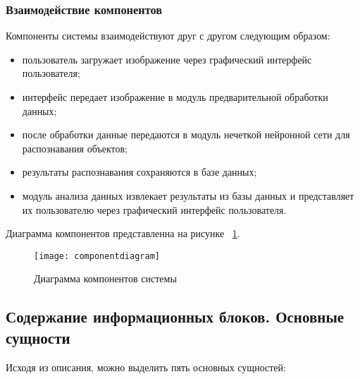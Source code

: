 \subsubsection{Взаимодействие компонентов}
Компоненты системы взаимодействуют друг с другом следующим образом:

\begin{itemize}
\item пользователь загружает изображение через графический интерфейс пользователя;
\item интерфейс передает изображение в модуль предварительной обработки данных;
\item после обработки данные передаются в модуль нечеткой нейронной сети для распознавания объектов;
\item результаты распознавания сохраняются в базе данных;
\item модуль анализа данных извлекает результаты из базы данных и представляет их пользователю через графический интерфейс пользователя.
\end{itemize}

Диаграмма компонентов представленна на рисунке ~\ref{componentdiagram:image}.

\begin{figure}[ht]
\centering
\texttt{[image: componentdiagram]}
\caption{Диаграмма компонентов системы}
\label{componentdiagram:image}
\end{figure}

\subsection{Содержание информационных блоков. Основные сущности}

Исходя из описания, можно выделить пять основных сущностей:

